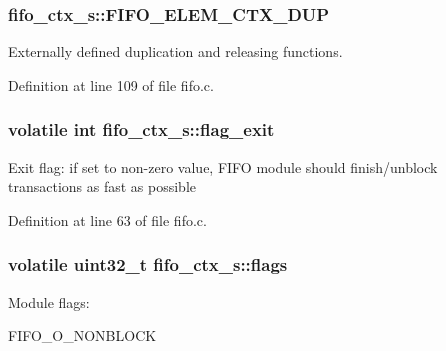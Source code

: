\subsubsection[{\texorpdfstring{F\+I\+F\+O\+\_\+\+E\+L\+E\+M\+\_\+\+C\+T\+X\+\_\+\+D\+UP}{FIFO_ELEM_CTX_DUP}}]{\setlength{\rightskip}{0pt plus 5cm}fifo\+\_\+ctx\+\_\+s\+::\+F\+I\+F\+O\+\_\+\+E\+L\+E\+M\+\_\+\+C\+T\+X\+\_\+\+D\+UP}\hypertarget{structfifo__ctx__s_a5733ada7a9bf525cdddf6d839a4eef03}{}\label{structfifo__ctx__s_a5733ada7a9bf525cdddf6d839a4eef03}
Externally defined duplication and releasing functions. 

Definition at line 109 of file fifo.\+c.

\subsubsection[{\texorpdfstring{flag\+\_\+exit}{flag_exit}}]{\setlength{\rightskip}{0pt plus 5cm}volatile int fifo\+\_\+ctx\+\_\+s\+::flag\+\_\+exit}\hypertarget{structfifo__ctx__s_a4856c98e4576bd328ff3ee4063b1421a}{}\label{structfifo__ctx__s_a4856c98e4576bd328ff3ee4063b1421a}
Exit flag\+: if set to non-\/zero value, F\+I\+FO module should finish/unblock transactions as fast as possible 

Definition at line 63 of file fifo.\+c.

\subsubsection[{\texorpdfstring{flags}{flags}}]{\setlength{\rightskip}{0pt plus 5cm}volatile uint32\+\_\+t fifo\+\_\+ctx\+\_\+s\+::flags}\hypertarget{structfifo__ctx__s_a6c86ce21bbd7a84d164d9c5ecf72ac3a}{}\label{structfifo__ctx__s_a6c86ce21bbd7a84d164d9c5ecf72ac3a}
Module flags\+:
\begin{DoxyItemize}
\item F\+I\+F\+O\+\_\+\+O\+\_\+\+N\+O\+N\+B\+L\+O\+CK 
\end{DoxyItemize}

